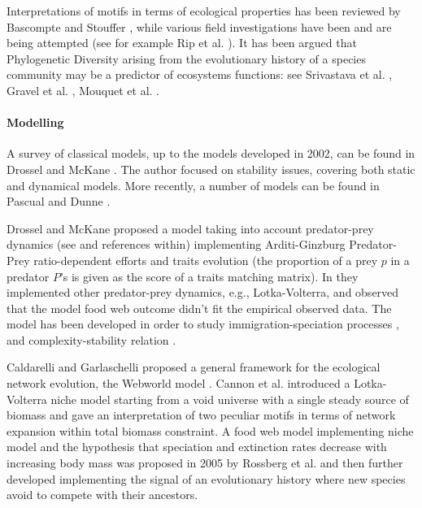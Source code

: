 \documentclass[12pt,a4paper]{report}
\begin{document}
Interpretations of motifs in terms of ecological properties has been reviewed by Bascompte and Stouffer \cite{bascompte_assembly_2009}, while various field investigations have been and are being attempted (see for example Rip et al. \cite{rip_experimental_2010}). It has been argued that Phylogenetic Diversity arising from the evolutionary history of a species community may be a predictor of ecosystems functions: see  Srivastava et al. \cite{srivastava_phylogenetic_2012}, Gravel et al. \cite{gravel2010experimental}, Mouquet et al. \cite{mouquet2012ecophylogenetics}.

\paragraph{Modelling}
A survey of classical models, up to the models developed in 2002, can be found in Drossel and McKane \cite{drossel_modelling_2002}. The author focused on stability issues, covering both static and dynamical models. More recently, a number of models can be found in Pascual and Dunne \cite{pascual_ecological_2005}.

Drossel and McKane proposed a model taking into account predator-prey dynamics (see \cite{drossel_influence_2000, mckane_models_2005} and references within) implementing Arditi-Ginzburg Predator-Prey ratio-dependent efforts \cite{arditi_coupling_1989} and traits evolution (the proportion of a prey $p$ in a predator $P$'s is given as the score of a traits matching matrix). In \cite{quince_topological_2005} they implemented other predator-prey dynamics, e.g., Lotka-Volterra, and observed that the model food web outcome didn't fit the empirical observed data. The model has been developed in order to study immigration-speciation processes \cite{powell_comparison_2009}, and complexity-stability relation \cite{plitzko_complexitystability_2012}.

Caldarelli and Garlaschelli proposed a general framework for the ecological network evolution, the Webworld model \cite{caldarelli_modelling_1998}. Cannon et al. introduced a Lotka-Volterra niche model starting from a void universe with a single steady source of biomass \cite{cannon_diversification_2010} and gave an interpretation of two peculiar motifs in terms of network expansion within total biomass constraint. A food web model implementing niche model and the hypothesis that speciation and extinction rates decrease with increasing body mass was proposed in 2005 by Rossberg et al. \cite{rossberg_explanatory_2005} and then further developed \cite{rossberg_food_2006} implementing the signal of an evolutionary history where new species avoid to compete with their ancestors.
\end{document}
